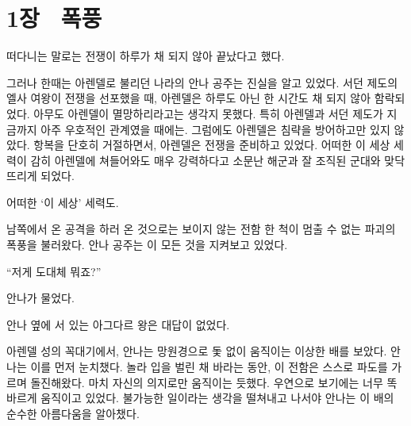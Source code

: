 

\chapter[1장  폭풍][1장\hspace*{.5em}폭풍]{1장 \ 폭풍}



떠다니는 말로는 전쟁이 하루가 채 되지 않아 끝났다고 했다.

그러나 한때는 아렌델로 불리던 나라의 안나 공주는 진실을 알고 있었다. 서던 제도의 엘사 여왕이 전쟁을 선포했을 때, 아렌델은 하루도 아닌 한 시간도 채 되지 않아 함락되었다. 아무도 아렌델이 멸망하리라고는 생각지 못했다. 특히 아렌델과 서던 제도가 지금까지 아주 우호적인 관계였을 때에는. 그럼에도 아렌델은 침략을 방어하고만 있지 않았다. 항복을 단호히 거절하면서, 아렌델은 전쟁을 준비하고 있었다. 어떠한 이 세상 세력이 감히 아렌델에 쳐들어와도 매우 강력하다고 소문난 해군과 잘 조직된 군대와 맞닥뜨리게 되었다.

어떠한 `이 세상' 세력도.

남쪽에서 온 공격을 하러 온 것으로는 보이지 않는 전함 한 척이 멈출 수 없는 파괴의 폭풍을 불러왔다. 안나 공주는 이 모든 것을 지켜보고 있었다.

\textbreak

\forceindent``저게 도대체 뭐죠?''

안나가 물었다.

안나 옆에 서 있는 아그다르 왕은 대답이 없었다.

아렌델 성의 꼭대기에서, 안나는 망원경으로 돛 없이 움직이는 이상한 배를 보았다. 안나는 이를 먼저 눈치챘다. 놀라 입을 벌린 채 바라는 동안, 이 전함은 스스로 파도를 가르며 돌진해왔다. 마치 자신의 의지로만 움직이는 듯했다. 우연으로 보기에는 너무 똑바르게 움직이고 있었다. 불가능한 일이라는 생각을 떨쳐내고 나서야 안나는 이 배의 순수한 아름다움을 알아챘다.

